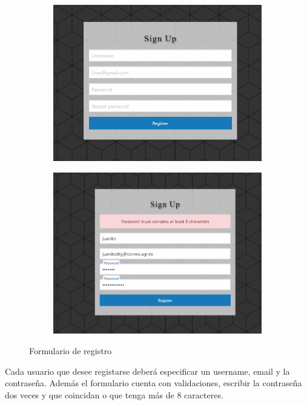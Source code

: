 \begin{figure}
  \centering
  \begin{subfigure}{0.7\textwidth}
    \includegraphics[width=\linewidth]{imagenes/register.png}
    \label{fig:imagen1}
  \end{subfigure}
  \hfill
  \begin{subfigure}{0.7\textwidth}
    \includegraphics[width=\linewidth]{imagenes/register2.png}
    \label{fig:imagen2}
  \end{subfigure}

  \caption{Formulario de registro}
  \label{fig:general}
\end{figure}

Cada usuario que desee registarse deberá especificar un username, email y la contraseña. Además el formulario cuenta con validaciones, escribir la contraseña dos veces y que coincidan o que tenga más de 8 caracteres. \vspace{3cm}

